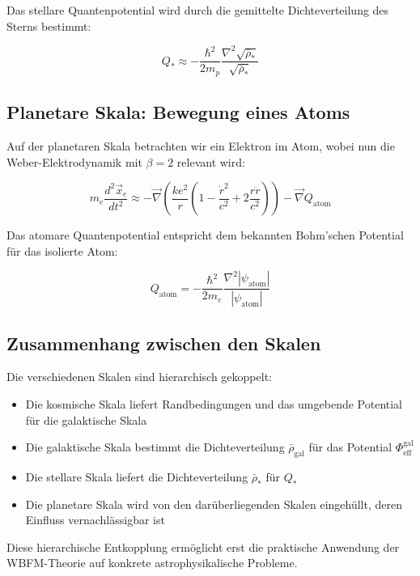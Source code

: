 Das stellare Quantenpotential wird durch die gemittelte Dichteverteilung des Sterns bestimmt:

\begin{equation}
Q_{*} \approx -\frac{\hbar^2}{2 m_p} \frac{\nabla^2 \sqrt{\bar{\rho}_{*}}}{\sqrt{\bar{\rho}_{*}}}
\end{equation}

\subsection{Planetare Skala: Bewegung eines Atoms}

Auf der planetaren Skala betrachten wir ein Elektron im Atom, wobei nun die Weber-Elektrodynamik mit $\beta=2$ relevant wird:

\begin{equation}
m_e \frac{d^2 \vec{x}_e}{dt^2} \approx -\vec{\nabla} \left( \frac{k e^2}{r} \left(1 - \frac{\dot{r}^2}{c^2} + 2 \frac{r \ddot{r}}{c^2}\right) \right) - \vec{\nabla} Q_{\text{atom}}
\end{equation}

Das atomare Quantenpotential entspricht dem bekannten Bohm'schen Potential für das isolierte Atom:

\begin{equation}
Q_{\text{atom}} = -\frac{\hbar^2}{2 m_e} \frac{\nabla^2 |\psi_{\text{atom}}|}{|\psi_{\text{atom}}|}
\end{equation}

\subsection{Zusammenhang zwischen den Skalen}

Die verschiedenen Skalen sind hierarchisch gekoppelt:
\begin{itemize}
\item Die kosmische Skala liefert Randbedingungen und das umgebende Potential für die galaktische Skala
\item Die galaktische Skala bestimmt die Dichteverteilung $\bar{\rho}_{\text{gal}}$ für das Potential $\Phi_{\text{eff}}^{\text{gal}}$
\item Die stellare Skala liefert die Dichteverteilung $\bar{\rho}_{*}$ für $Q_{*}$
\item Die planetare Skala wird von den darüberliegenden Skalen eingehüllt, deren Einfluss vernachlässigbar ist
\end{itemize}

Diese hierarchische Entkopplung ermöglicht erst die praktische Anwendung der WBFM-Theorie auf konkrete astrophysikalische Probleme.
